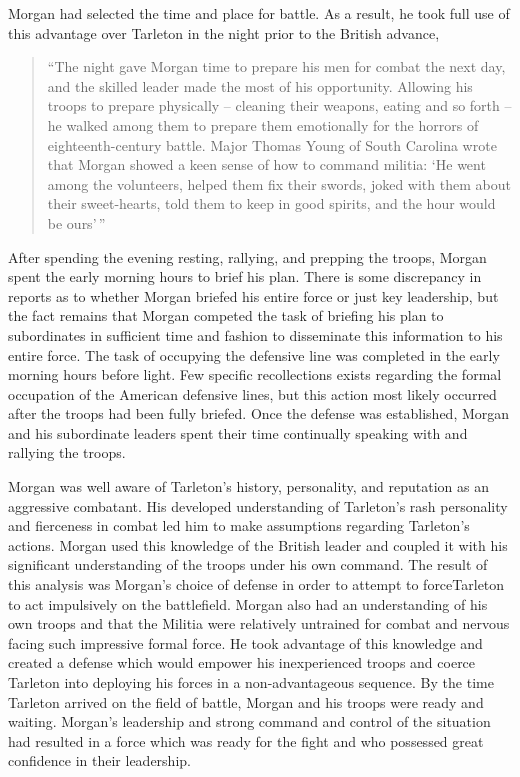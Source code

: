 Morgan had selected the time and place for battle. As a result, he took full
use of this advantage over Tarleton in the night prior to the British advance,

\begin{quote}
  ``The night gave Morgan time to prepare his men for combat the next day, and
  the skilled leader made the most of his opportunity. Allowing his troops to
  prepare physically -- cleaning their weapons, eating and so forth -- he walked
  among them to prepare them emotionally for the horrors of eighteenth-century
  battle. Major Thomas Young of South Carolina wrote that Morgan showed a keen
  sense of how to command militia: `He went among the volunteers, helped them
  fix their swords, joked with them about their sweet-hearts, told them to keep
  in good spirits, and the hour would be ours'\,'' \cite[47]{moncure_cowpens_1996}
\end{quote}

After spending the evening resting, rallying, and prepping the troops, Morgan
spent the early morning hours to brief his plan. There is some discrepancy in
reports as to whether Morgan briefed his entire force or just key leadership,
but the fact remains that Morgan competed the task of briefing his plan to
subordinates in sufficient time and fashion to disseminate this information to
his entire force. The task of occupying the defensive line was completed in the
early morning hours before light. Few specific recollections exists regarding
the formal occupation of the American defensive lines, but this action most
likely occurred after the troops had been fully briefed. Once the defense was
established, Morgan and his subordinate leaders spent their time continually
speaking with and rallying the troops.

Morgan was well aware of Tarleton's history, personality, and reputation as an
aggressive combatant. His developed understanding of Tarleton's rash
personality and fierceness in combat led him to make assumptions regarding
Tarleton's actions. Morgan used this knowledge of the British leader and
coupled it with his significant understanding of the troops under his own
command. The result of this analysis was Morgan's choice of defense in order to
attempt to forceTarleton to act impulsively on the battlefield. Morgan also had
an understanding of his own troops and that the Militia were relatively
untrained for combat and nervous facing such impressive formal force. He took
advantage of this knowledge and created a defense which would empower his
inexperienced troops and coerce Tarleton into deploying his forces in a
non-advantageous sequence. By the time Tarleton arrived on the field of battle,
Morgan and his troops were ready and waiting. Morgan's leadership and strong
command and control of the situation had resulted in a force which was ready
for the fight and who possessed great confidence in their leadership.

